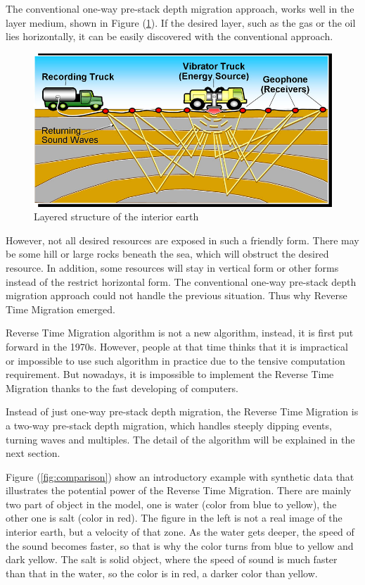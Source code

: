 The conventional one-way pre-stack depth migration approach, works well in
the layer medium, shown in Figure (\ref{fig:layer_structure}). If the desired
layer, such as the gas or the oil lies horizontally, it can be easily
discovered with the conventional approach.

\begin{figure}[h]
  \centering
  \includegraphics[scale=.45]{img/layer_structure.jpg}
  \caption{Layered structure of the interior earth}
  \label{fig:layer_structure}
\end{figure}

However, not all desired resources are exposed in such a friendly form.
There may be some hill or large rocks beneath the sea, which will obstruct
the desired resource. In addition, some resources will stay in vertical
form or other forms instead of the restrict horizontal form. The
conventional one-way pre-stack depth migration approach could not handle
the previous situation. Thus why Reverse Time Migration emerged.

Reverse Time Migration algorithm is not a new algorithm, instead, it is
first put forward in the 1970s. However, people at that time thinks that it
is impractical or impossible to use such algorithm in practice due to the
tensive  computation requirement. But nowadays, it is impossible to
implement the Reverse Time Migration thanks to the fast developing of
computers.

Instead of just one-way pre-stack depth migration, the Reverse Time
Migration is a two-way pre-stack depth migration, which handles steeply
dipping events, turning waves and multiples. The detail of the algorithm
will be explained in the next section.

Figure (\ref{fig:comparison}) show an introductory example with synthetic
data that illustrates the potential power of the Reverse Time Migration.
There are mainly two part of object in the model, one is water (color from
blue to yellow), the other one is salt (color in red). The figure in the
left is not a real image of the interior earth, but a velocity of that
zone. As the water gets deeper, the speed of the sound becomes faster, so
that is why the color turns from blue to yellow and dark yellow. The salt
is solid object, where the speed of sound is much faster than that in the
water, so the color is in red, a darker color than yellow.

